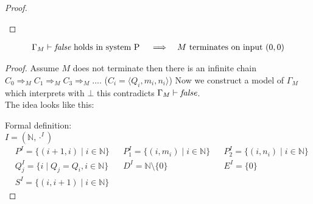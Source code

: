 \begin{proof}
\begin{figure}[H]
\end{figure}
\end{proof}
\begin{claim}
\begin{align*}
&\text{$\Gamma_M\vdash\emph{false}$ holds in system P} && \implies &\text{$M$ terminates on input $(0,0)$}
\end{align*}
\end{claim}
\begin{proof}
Assume $M$ does not terminate then there is an infinite chain $C_0\Rightarrow_M C_1\Rightarrow_M C_3\Rightarrow_M\dots$. ($C_i=\langle Q_i,m_i,n_i\rangle$) Now we construct a model of $\Gamma_M$ which interprets \false{} with $\bot$ this contradicts $\Gamma_M\vdash\emph{false}$.\\
The idea looks like this:\\
\begin{figure}[H]

\end{figure}
Formal definition:\\
$I=(\mathbb{N},\cdot^I)$
\begin{align*}
& P^I=\{(i+1,i)\mid i\in\mathbb{N}\} && P_1^I=\{(i,m_i)\mid i\in\mathbb{N}\} && P_2^I=\{(i,n_i)\mid i\in\mathbb{N}\}\\
& Q_j^I=\{i\mid Q_j=Q_i, i\in\mathbb{N}\} && D^I=\mathbb{N}\setminus\{0\} && E^I=\{0\}\\
& S^I=\{(i,i+1)\mid i\in\mathbb{N}\}
\end{align*}
\end{proof}